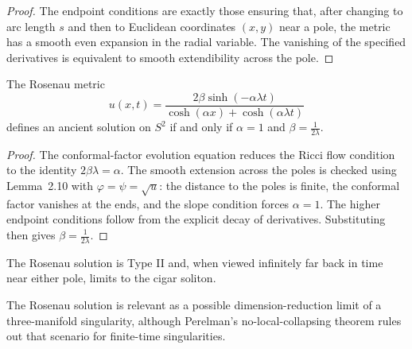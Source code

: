 \begin{proof}
The endpoint conditions are exactly those ensuring that, after changing to arc
length \(s\) and then to Euclidean coordinates \((x,y)\) near a pole, the metric
has a smooth even expansion in the radial variable. The vanishing of the
specified derivatives is equivalent to smooth extendibility across the pole.
\end{proof}

\begin{lemma}
\label{ch02-lem-rosenau-sphere}
The Rosenau metric
\[
u(x,t)=\frac{2\beta\sinh(-\alpha\lambda t)}{\cosh(\alpha x)+\cosh(\alpha\lambda t)}
\]
defines an ancient solution on \(S^2\) if and only if \(\alpha=1\) and
\(\beta=\frac{1}{2\lambda}\).
\end{lemma}

\begin{proof}
The conformal-factor evolution equation reduces the Ricci flow condition to the
identity \(2\beta\lambda=\alpha\). The smooth extension across the poles is
checked using Lemma~2.10 with \(\varphi=\psi=\sqrt{u}\): the distance to the
poles is finite, the conformal factor vanishes at the ends, and the slope
condition forces \(\alpha=1\). The higher endpoint conditions follow from the
explicit decay of derivatives. Substituting then gives \(\beta=\frac1{2\lambda}\).
\end{proof}

\begin{remark}
\label{ch02-rem-rosenau-limit-cigar}
The Rosenau solution is Type II and, when viewed infinitely far back in time
near either pole, limits to the cigar soliton.
\end{remark}

\begin{remark}
\label{ch02-rem-rosenau-singularity-model}
The Rosenau solution is relevant as a possible dimension-reduction limit of a
three-manifold singularity, although Perelman's no-local-collapsing theorem
rules out that scenario for finite-time singularities.
\end{remark}

